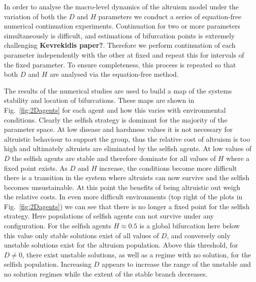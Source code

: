 \documentclass[11pt]{article}
\begin{document}
In order to analyse the macro-level dynamics of the altruism model under the variation of both the $D$ and $H$ parameters we conduct a series of equation-free numerical continuation experiments. Continuation for two or more parameters simultaneously is difficult, and estimations of bifurcation points is extremely challenging {\bf Kevrekidis paper?}. Therefore we perform continuation of each parameter independently with the other at fixed and repeat this for intervals of the fixed parameter. To ensure completeness, this process is repeated so that both $D$ and $H$ are analysed via the equation-free method. 

The results of the numerical studies are used to build a map of the systems stability and location of bifurcations. These maps are shown in Fig.~\ref{fig:2Dagents} for each agent and how this varies with environmental conditions. Clearly the selfish strategy is dominant for the majority of the parameter space. At low disease and harshness values it is not necessary for altruistic behaviour to support the group, thus the relative cost of altruism is too high and ultimately altruists are eliminated by the selfish agents. At low values of $D$ the selfish agents are stable and therefore dominate for all values of $H$ where a fixed point exists. As $D$ and $H$ increase, the conditions become more difficult there is a transition in the system where altruists can now survive and the selfish becomes unsustainable. At this point the benefits of being altruistic out weigh the relative costs. In even more difficult environments (top right of the plots in Fig.~\ref{fig:2Dagents}) we can see that there is no longer a fixed point for the selfish strategy. Here populations of selfish agents can not survive under any configuration. For the selfish agents $H\approx 0.5$ is a global bifurcation here below this value only stable solutions exist of all values of $D$, and conversely only unstable solutions exist for the altruism population. Above this threshold, for $D\neq0$, there exist unstable solutions, as well as a regime with no solution, for the selfish population. Increasing $D$ appears to increase the range of the unstable and no solution regimes while the extent of the stable branch decreases.
\end{document}
